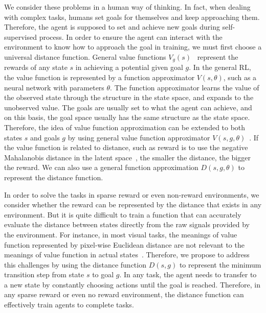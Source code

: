 \documentclass[8pt,twoside,a4paper]{article}
\begin{document}
\par We consider these problems in a human way of thinking. In fact, when dealing with complex tasks, humans set goals for themselves and keep approaching them. Therefore, the agent is supposed to set and achieve new goals during self-supervised process. In order to ensure the agent can interact with the environment to know how to approach the goal in training, we must first choose a universal distance function. General value functions $V_g(s)$~\cite{sutton2011horde} represent the rewards of any state $s$ in achieving a potential given goal $g$. In the general RL, the value function is represented by a function approximator $V(s,\theta)$, such as a neural network with parameters $\theta$. The function approximator learns the value of the observed state through the structure in the state space, and expands to the unobserved value. The goals are usually set to what the agent can achieve, and on this basis, the goal space usually has the same structure as the state space. Therefore, the idea of value function approximation can be extended to both states $s$ and goals $g$ by using general value function approximator $V(s,g,\theta)$~\cite{schaul2015universal}. If the value function is related to distance, such as reward is to use the negative Mahalanobis distance in the latent space~\cite{nair2018visual}, the smaller the distance, the bigger the reward. We can also use a general function approximation $D(s,g,\theta)$ to represent the distance function.

\par In order to solve the tasks in sparse reward or even non-reward environments, we consider whether the reward can be represented by the distance that exists in any environment. But it is quite difficult to train a function that can accurately evaluate the distance between states directly from the raw signals provided by the environment. For instance, in most visual tasks, the meanings of value function represented by pixel-wise Euclidean distance are not relevant to the meanings of value function in actual states~\cite{ponomarenko2015image,zhang2018unreasonable}. Therefore, we propose to address this challenges by using the distance function $D(s, g)$ to represent the minimum transition step from state $s$ to goal $g$. In any task, the agent needs to transfer to a new state by constantly choosing actions until the goal is reached. Therefore, in any sparse reward or even no reward environment, the distance function can effectively train agents to complete tasks.
\end{document}
